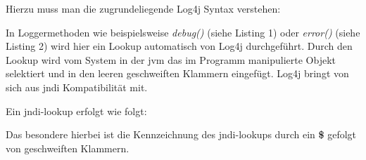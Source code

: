 Hierzu muss man die zugrundeliegende Log4j Syntax verstehen:

\bigskip

In Loggermethoden wie beispielsweise \textit{debug()} (siehe Listing 1) oder \textit{error()} (siehe Listing 2) wird hier ein Lookup automatisch von Log4j durchgeführt.
Durch den Lookup wird vom System in der \gls{jvm} das im Programm manipulierte Objekt selektiert und in den leeren geschweiften Klammern eingefügt.
Log4j bringt von sich aus \gls{jndi} Kompatibilität mit.

\newpage

Ein \gls{jndi}-lookup erfolgt wie folgt:

\bigskip

Das besondere hierbei ist die Kennzeichnung des \gls{jndi}-lookups durch ein \textbf{\$} gefolgt von geschweiften Klammern.